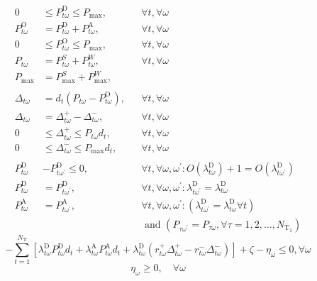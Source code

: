 \begin{align}
0 &\leq P_{t \omega}^{\mathrm{D}} \leq P_{\mathrm{max}}, &  &\forall t, \forall \omega \\
P_{t \omega}^{\mathrm{O}}&=P_{t \omega}^{\mathrm{D}}+P_{t \omega}^{\mathrm{A}},&  &\forall t, \forall \omega \\
0 &\leq P_{t \omega}^{\mathrm{O}} \leq P_{\max }, & & \forall t, \forall \omega \\
P_{t\omega}&= P_{t\omega}^S+P_{t\omega}^W, & &\forall t,\forall \omega \\
P_{\max}&= P^{S}_{\max}+P^{W}_{\max},  \\
\nonumber \\
\Delta_{t \omega}&=d_{t}\left(P_{t \omega}-P_{t \omega}^{\mathrm{O}}\right), &&\forall t, \forall \omega \\
\Delta_{t \omega}&=\Delta_{t \omega}^{+}-\Delta_{t \omega}^{-}, &&\forall t, \forall \omega \\
0& \leq \Delta_{t \omega}^{+} \leq P_{t \omega} d_{t}, &&\forall t, \forall \omega \\
0& \leq \Delta_{t \omega}^{-} \leq P_{\max } d_{t}, &&\forall t, \forall \omega \\
\nonumber \\
P_{t \omega}^{\mathrm{D}}&-P_{t \omega^{\prime}}^{\mathrm{D}} \leq 0, && \forall t, \forall \omega, \omega^{\prime}: O\left(\lambda_{t \omega}^{\mathrm{D}}\right)+1=O\left(\lambda_{t \omega^{\prime}}^{\mathrm{D}}\right) \\
P_{t \omega}^{\mathrm{D}}&=P_{t \omega^{\prime}}^{\mathrm{D}}, && \forall t, \forall \omega, \omega^{\prime}: \lambda_{t \omega^{\prime}}^{\mathrm{D}}=\lambda_{t \omega}^{\mathrm{D}} \\
P_{t \omega}^{\mathrm{A}}&=P_{t \omega^{\prime}}^{\mathrm{A}},&& \forall t, \forall \omega, \omega^{\prime}:\left(\lambda_{t \omega^{\prime}}^{\mathrm{D}}=\lambda_{t \omega}^{\mathrm{D}} \forall t\right) \nonumber \\
& &&\text { and } \left(P_{\tau \omega^{\prime}}=P_{\tau \omega}, \forall \tau=1,2, \ldots, N_{\mathrm{T}_{1}}\right) 
\end{align}
\begin{equation}
-\sum_{t=1}^{N_{\mathrm{T}}}\left[\lambda_{t \omega}^{\mathrm{D}} P_{t \omega}^{\mathrm{D}} d_{t}+\lambda_{t \omega}^{\mathrm{A}} P_{t \omega}^{\mathrm{A}} d_{t}+\lambda_{t \omega}^{\mathrm{D}}\left(r_{t \omega}^{+} \Delta_{t \omega}^{+}-r_{t \omega}^{-} \Delta_{t \omega}^{-}\right)\right]+\zeta-\eta_{\omega} \leq 0, \forall \omega
\end{equation}
\begin{equation}
\eta_{\omega} \geq 0, \quad \forall \omega
\end{equation}